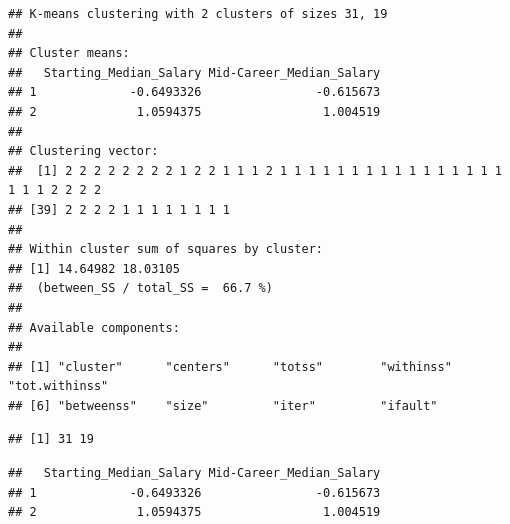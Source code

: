 \documentclass[]{article}
\newenvironment{Shaded}{\begin{snugshade}}{\end{snugshade}}
\newcommand{\KeywordTok}[1]{\textcolor[rgb]{0.13,0.29,0.53}{\textbf{#1}}}
\newcommand{\DecValTok}[1]{\textcolor[rgb]{0.00,0.00,0.81}{#1}}
\newcommand{\StringTok}[1]{\textcolor[rgb]{0.31,0.60,0.02}{#1}}
\newcommand{\OperatorTok}[1]{\textcolor[rgb]{0.81,0.36,0.00}{\textbf{#1}}}
\newcommand{\NormalTok}[1]{#1}
\begin{document}
\begin{Shaded}
\end{Shaded}

\begin{verbatim}
## K-means clustering with 2 clusters of sizes 31, 19
## 
## Cluster means:
##   Starting_Median_Salary Mid-Career_Median_Salary
## 1             -0.6493326                -0.615673
## 2              1.0594375                 1.004519
## 
## Clustering vector:
##  [1] 2 2 2 2 2 2 2 2 1 2 2 1 1 1 2 1 1 1 1 1 1 1 1 1 1 1 1 1 1 1 1 1 1 1 2 2 2 2
## [39] 2 2 2 2 1 1 1 1 1 1 1 1
## 
## Within cluster sum of squares by cluster:
## [1] 14.64982 18.03105
##  (between_SS / total_SS =  66.7 %)
## 
## Available components:
## 
## [1] "cluster"      "centers"      "totss"        "withinss"     "tot.withinss"
## [6] "betweenss"    "size"         "iter"         "ifault"
\end{verbatim}

\begin{Shaded}
\end{Shaded}

\begin{verbatim}
## [1] 31 19
\end{verbatim}

\begin{Shaded}
\end{Shaded}

\begin{verbatim}
##   Starting_Median_Salary Mid-Career_Median_Salary
## 1             -0.6493326                -0.615673
## 2              1.0594375                 1.004519
\end{verbatim}

\begin{Shaded}
\end{Shaded}
\end{document}

